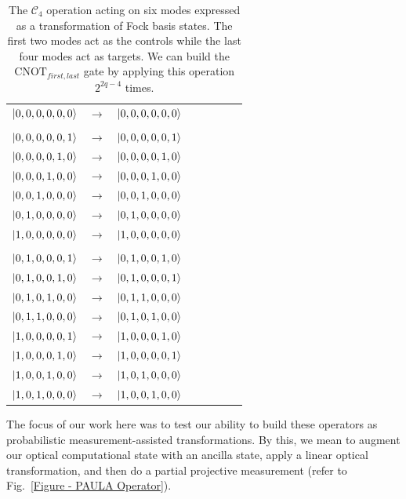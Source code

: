 \documentclass[aps,pra,twocolumn,showpacs,superscriptaddress,floatfix,10pt]{revtex4}
\begin{document}
\begin {table}[h]
\begin{center}
	\begin{tabular}{l*{6}{c}r} 
		$\ket{0,0,0,0,0,0}$  &  $\rightarrow$ & $\ket{0,0,0,0,0,0}$ \\ \\
		$\ket{0,0,0,0,0,1}$  & $\rightarrow$ & $\ket{0,0,0,0,0,1}$ \\
		$\ket{0,0,0,0,1,0}$ & $\rightarrow$ & $\ket{0,0,0,0,1,0}$ \\
		$\ket{0,0,0,1,0,0}$ & $\rightarrow$ & $\ket{0,0,0,1,0,0} $ \\ 
		$\ket{0,0,1,0,0,0}$ & $\rightarrow$ & $\ket{0,0,1,0,0,0} $\\
		$\ket{0,1,0,0,0,0}$ & $\rightarrow$ & $\ket{0,1,0,0,0,0} $ \\
		$\ket{1,0,0,0,0,0}$ & $\rightarrow$ & $\ket{1,0,0,0,0,0} $ \\ \\
		$\ket{0,1,0,0,0,1}$  & $\rightarrow$ & $\ket{0,1,0,0,1,0}$ \\
		$\ket{0,1,0,0,1,0}$  & $\rightarrow$ & $\ket{0,1,0,0,0,1}$ \\
		$\ket{0,1,0,1,0,0}$  & $\rightarrow$ & $\ket{0,1,1,0,0,0}$ \\
		$\ket{0,1,1,0,0,0}$  & $\rightarrow$ & $\ket{0,1,0,1,0,0}$ \\
		$\ket{1,0,0,0,0,1}$  & $\rightarrow$ & $\ket{1,0,0,0,1,0}$ \\
		$\ket{1,0,0,0,1,0}$  & $\rightarrow$ & $\ket{1,0,0,0,0,1}$ \\
		$\ket{1,0,0,1,0,0}$  & $\rightarrow$ & $\ket{1,0,1,0,0,0}$ \\
		$\ket{1,0,1,0,0,0}$  & $\rightarrow$ & $\ket{1,0,0,1,0,0}$ \\
	\end{tabular}
	\caption{ \label{Two Controls Four Targets} The $\mathcal{C}_4$ operation acting on six modes expressed as a transformation of Fock basis states. The first two modes act as the controls while the last four modes act as targets. We can build the $\mbox{CNOT}_{first,last}$ gate by applying this operation $2^{2 q - 4}$ times.}
\end{center}
\end{table}
The focus of our work here was to test our ability to build these operators as probabilistic measurement-assisted transformations. By this, we mean to augment our optical computational state with an ancilla state, apply a linear optical transformation, and then do a partial projective measurement (refer to Fig.~\ref{Figure - PAULA Operator}). 
\end{document}
